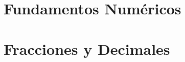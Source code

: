 \documentclass[12pt,a4paper,twoside]{book}
\begin{document}
	
	
	
	
	\chapter{Fundamentos Num\'{e}ricos}
	
	
	 
     
     
	
	
	 
	 
	 
	
	
	
	
	
	\chapter{Fracciones y Decimales}
	
	
	
	
\end{document}
